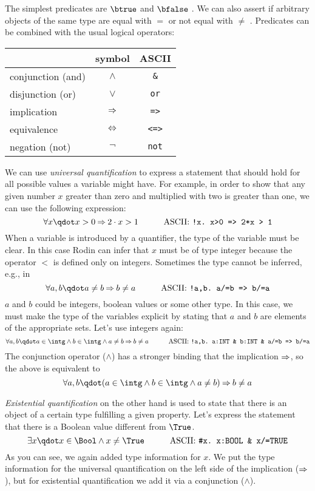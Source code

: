 The simplest predicates are $\btrue$  and $\bfalse$ .
We can also assert if arbitrary objects of the same type are equal with $=$ or not equal with $\neq$
\inascii{/=}.
Predicates can be combined with the usual logical operators:
\begin{center}
  \begin{tabular}{lcc}
                      & symbol   & ASCII \\
    \hline
    conjunction (and) & $\land$  & \texttt{\&} \\
    disjunction (or)   & $\lor$   & \texttt{or} \\
    implication       & $\mathbin\Rightarrow$  & \texttt{=>} \\
    equivalence       & $\mathbin\Leftrightarrow$  & \texttt{<=>} \\
    negation (not)    & $\lnot$  & \texttt{not} \\
  \end{tabular}
\end{center}
We can use \emph{universal quantification} to express a statement that should hold for all possible values
a variable might have. For example, in order to show that any given number $x$ greater than zero and multiplied with two is greater than one, we can use the following expression: 
\[ \forall x \qdot x>0 \limp 2\cdot x > 1 \lascii{!x.\ x>0\ =>\ 2*x\ >\ 1}\]
When a variable is introduced by a quantifier, the type of the variable must be clear. In this case Rodin can infer that $x$ must be of type integer because the operator $<$ is defined only on integers. Sometimes the type cannot be inferred, e.g., in
\[ \forall a,b \qdot a\neq b \limp b\neq a \lascii{!a,b.\ a/=b\ =>\ b/=a} \]
$a$ and $b$ could be integers, boolean values or some other type.
In this case, we must make the type of the variables explicit by stating that $a$ and $b$ are elements
of the appropriate sets. Let's use integers again:
\[ \forall a,b \qdot a\in\intg \land b\in\intg \land a\neq b \limp b\neq a \lascii{!a,b.\ a:INT \& b:INT \& a/=b => b/=a} \]
The conjunction operator ($\land$) has a stronger binding that the implication $\mathbin\Rightarrow$, so the above is equivalent to
\[ \forall a,b \qdot (a\in\intg \land b\in\intg \land a\neq b) \limp b\neq a\]


\emph{Existential quantification} on the other hand is used to state that there is an object of a certain type fulfilling a given property. Let's express the statement that there is a Boolean value different from
$\True$.
\[ \exists x \qdot x\in\Bool \land x\neq\True \lascii{\#x.\ x:BOOL\ \&\ x/=TRUE} \]
As you can see, we again added type information for $x$. We put the type information for the universal quantification on the left side of the implication ($\mathbin\Rightarrow$), but
for existential quantification we add it via a conjunction ($\land$).

